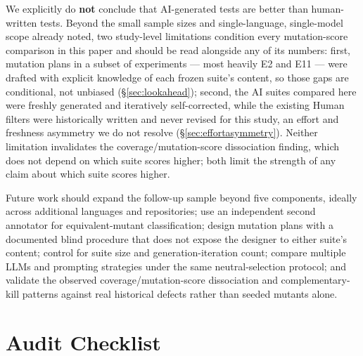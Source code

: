 \documentclass[10pt,conference]{IEEEtran}
\begin{document}
We explicitly do \textbf{not} conclude that AI-generated tests are better than human-written tests. Beyond the small sample sizes and single-language, single-model scope already noted, two study-level limitations condition every mutation-score comparison in this paper and should be read alongside any of its numbers: first, mutation plans in a subset of experiments — most heavily E2 and E11 — were drafted with explicit knowledge of each frozen suite's content, so those gaps are conditional, not unbiased (\S\ref{sec:lookahead}); second, the AI suites compared here were freshly generated and iteratively self-corrected, while the existing Human filters were historically written and never revised for this study, an effort and freshness asymmetry we do not resolve (\S\ref{sec:effortasymmetry}). Neither limitation invalidates the coverage/mutation-score dissociation finding, which does not depend on which suite scores higher; both limit the strength of any claim about which suite scores higher.

Future work should expand the follow-up sample beyond five components, ideally across additional languages and repositories; use an independent second annotator for equivalent-mutant classification; design mutation plans with a documented blind procedure that does not expose the designer to either suite's content; control for suite size and generation-iteration count; compare multiple LLMs and prompting strategies under the same neutral-selection protocol; and validate the observed coverage/mutation-score dissociation and complementary-kill patterns against real historical defects rather than seeded mutants alone.




\appendices
\section{Audit Checklist}
\label{app:audit}
\end{document}
